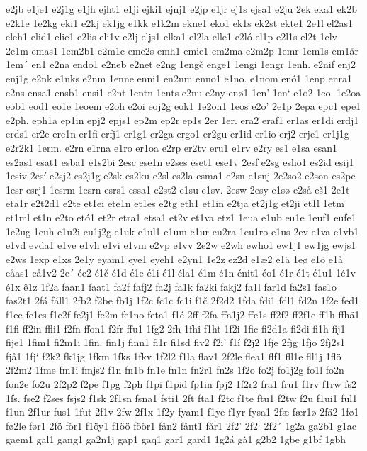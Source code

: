 e2jb
e1je1
e2j1g
e1jh
ejht1
e1ji
ejki1
ejnj1
e2jp
e1jr
ej1s
ejsa1
e2ju
2ek
eka1
ek2b
e2k1e
1e2kg
eki1
e2kj
ek1jg
e1kk
e1k2m
ekne1
eko1
ek1s
ek2st
ekte1
2e1l
el2as1
eleh1
elid1
elie1
e2lis
eli1v
e2lj
eljs1
elka1
el2la
elle1
e2ló
el1p
e2l1s
el2t
1elv
2e1m
emas1
1em2b1
e2m1c
eme2s
emh1
emie1
em2ma
e2m2p
1emr
1em1s
em1år
1em´
en1
e2na
endo1
e2neb
e2net
e2ng
1engč
enge1
1engi
1engr
1enh.
e2nif
enj2
enj1g
e2nk
e1nks
e2nm
1enne
enni1
en2nm
enno1
e1no.
e1nom
enó1
1enp
enra1
e2ns
ensa1
ensb1
ensi1
e2nt
1entn
1ents
e2nu
e2ny
enø1
1en'
1en`
e1o2
1eo.
1e2oa
eob1
eod1
eo1e
1eoem
e2oh
e2oi
eoj2g
eok1
1e2on1
1eos
e2o'
2e1p
2epa
epc1
epe1
e2ph.
eph1a
ep1in
epj2
epjs1
ep2m
ep2r
ep1s
2er
1er.
era2
eraf1
er1as
er1di
erdj1
erds1
er2e
ere1n
er1fi
erfj1
er1g1
er2ga
ergo1
er2gu
er1id
er1io
erj2
erje1
er1j1g
e2r2k1
1erm.
e2rn
e1rna
e1ro
er1oa
e2rp
er2tv
eru1
e1rv
e2ry
es1
e1sa
esan1
es2as1
esat1
esba1
e1s2bi
2esc
ese1n
e2ses
eset1
ese1v
2esf
e2sg
eshö1
es2id
esij1
1esiv
2esí
e2sj2
es2j1g
e2sk
es2ku
e2sl
es2la
esma1
e2sn
e1snj
2e2so2
e2son
es2pe
1esr
esrj1
1esrm
1esrn
esrs1
essa1
e2st2
e1su
e1sv.
2esw
2esy
e1sø
e2så
eš1
2e1t
eta1r
e2t2d1
e2te
et1ei
ete1n
et1es
e2tg
eth1
et1in
e2tja
et2j1g
et2ji
et1l
1etm
et1ml
et1n
e2to
etó1
et2r
etra1
etsa1
et2v
et1va
etz1
1eua
e1ub
eu1e
1euf1
eufe1
1e2ug
1euh
e1u2i
eu1j2g
e1uk
e1ul1
e1um
e1ur
eu2ra
1eu1ro
e1us
2ev
e1va
e1vb1
e1vd
evda1
e1ve
e1vh
e1vi
e1vm
e2vp
e1vv
2e2w
e2wh
ewho1
ew1j1
ew1jg
ewjs1
e2ws
1exp
e1xs
2e1y
eyam1
eye1
eyeh1
e2yn1
1e2z
ez2d
e1æ2
e1ä
1eø
e1ö
e1å
eåas1
eå1v2
2e´
éc2
é1č
é1d
é1e
é1i
é1l
éla1
é1m
é1n
énit1
éo1
é1r
é1t
é1u1
1é1v
é1x
ê1z
1f2a
faan1
faat1
fa2f
fafj2
fa2j
fa1k
fa2ki
fakj2
fa1l
far1d
fa2s1
fas1o
fas2t1
2fá
fáll1
2fb2
f2be
fb1j
1f2c
fc1c
fc1i
f1č
2f2d2
1fda
fdi1
fdl1
fd2n
1f2e
fed1
f1ee
fe1es
f1e2f
fe2j1
fe2m
fe1no
feta1
f1é
2ff
f2fa
ffa1j2
ffe1s
ff2f2
ff2f1e
ff1h
ffhä1
f1fi
ff2in
ffli1
f2fn
ffon1
f2fr
ffu1
1fg2
2fh
1fhi
f1ht
1f2i
1fic
fi2d1a
fi2di
fi1h
fij1
fije1
1fim1
fi2m1i
1fin.
fin1j
finn1
fi1r
fi1sd
fiv2
f2i'
f1í
f2j2
1fje
2fjg
1fjo
2fj2s1
fjå1
1fj`
f2k2
fk1jg
1fkm
1fks
1fkv
1f2l2
f1la
flav1
2f2le
flea1
flf1
fll1e
fll1j
1flö
2f2m2
1fme
fm1i
fmjs2
f1n
fn1b
fn1e
fn1n
fn2r1
fn2s
1f2o
fo2j
fo1j2g
fo1l
fo2n
fon2e
fo2u
2f2p2
f2pe
f1pg
f2ph
f1pi
f1pid
fp1in
fpj2
1f2r2
fra1
fru1
f1rv
f1rw
fs2
1fs.
fse2
f2ses
fsjs2
f1sk
2f1sn
fsna1
fsti1
2ft
fta1
f2tc
f1te
ftu1
f2tw
f2u
f1ui1
ful1
f1un
2f1ur
fus1
1fut
2f1v
2fw
2f1x
1f2y
fyam1
f1ye
f1yr
fysa1
2fæ
fær1ø
2fä2
1fø1
fø2le
før1
2fö
för1
f1öy1
f1öö
föör1
fån2
fånt1
får1
2f2'
2f2`
2f2´
1g2a
ga2b1
g1ac
gaem1
gal1
gang1
ga2n1j
gap1
gaq1
gar1
gard1
1g2á
gà1
g2b2
1gbe
g1bf
1gbh
